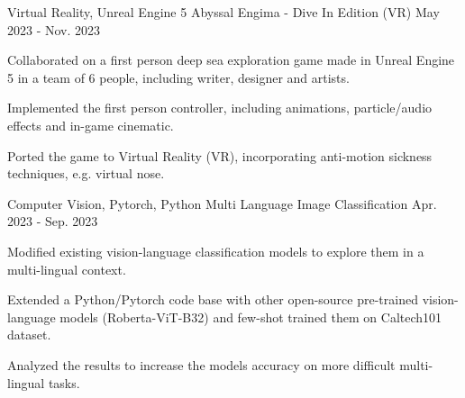 \begin{cventries}
  \cventry
    {Virtual Reality, Unreal Engine 5} %
    {Abyssal Engima - Dive In Edition (VR)} %
    {\href{https://miggli.itch.io/abyssal-enigma}{\faGamepad}} %
    {May 2023 - Nov. 2023} %
    {
      \begin{cvitems} %
        \item {Collaborated on a first person deep sea exploration game made in Unreal Engine 5 in a team of 6 people, including writer, designer and artists.}
        \item {Implemented the first person controller, including animations, particle/audio effects and in-game cinematic.}
        \item {Ported the game to Virtual Reality (VR), incorporating anti-motion sickness techniques, e.g. virtual nose.}
      \end{cvitems}
    }

  \cventry
    {Computer Vision, Pytorch, Python} %
    {Multi Language Image Classification} %
    {\href{https://github.com/BrandnerKasper/MP_CustomCoOp}{\faGithubSquare}} %
    {Apr. 2023 - Sep. 2023} %
    {
      \begin{cvitems} %
        \item {Modified existing vision-language classification models to explore them in a multi-lingual context.}
        \item {Extended a Python/Pytorch code base with other open-source pre-trained vision-language models (Roberta-ViT-B32) and few-shot trained them on Caltech101 dataset.}
        \item {Analyzed the results to increase the models accuracy on more difficult multi-lingual tasks.}
      \end{cvitems}
    }


\end{cventries}
